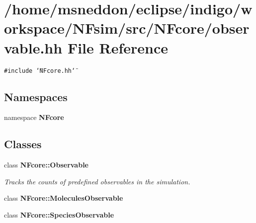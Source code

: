 \section{/home/msneddon/eclipse/indigo/workspace/NFsim/src/NFcore/observable.hh File Reference}
\label{observable_8hh}


{\tt \#include \char`\"{}NFcore.hh\char`\"{}}\par
\subsection*{Namespaces}
\begin{CompactItemize}
\item 
namespace {\bf NFcore}
\end{CompactItemize}
\subsection*{Classes}
\begin{CompactItemize}
\item 
class {\bf NFcore::Observable}
\begin{CompactList}\small\item\em Tracks the counts of predefined observables in the simulation. \item\end{CompactList}\item 
class {\bf NFcore::MoleculesObservable}
\item 
class {\bf NFcore::SpeciesObservable}
\end{CompactItemize}

